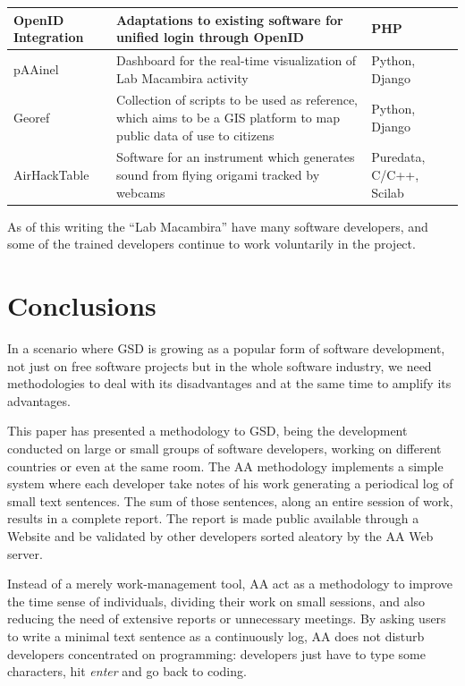 \documentclass[letterpaper]{article}
\begin{document}
\begin{table}
\begin{tabular}{|l|p{5cm}|l|}
        \hline
        OpenID Integration & Adaptations to existing software for
        unified login through OpenID & PHP \\
        \hline
        pAAinel & Dashboard for the real-time visualization of Lab
        Macambira activity & Python, Django \\
        \hline
        Georef & Collection of scripts to be used as reference, which
        aims to be a GIS platform to map public data of use to
        citizens & Python, Django \\
        \hline
        AirHackTable & Software for an instrument which generates
        sound from flying origami tracked by webcams & Puredata,
        C/C++, Scilab \\
        \hline
        \end{tabular}
    \label{tabela:criados}
\end{table}

As of this writing the ``Lab Macambira'' have many software
developers, and some of the trained developers continue to work
voluntarily in the project.

\section{Conclusions}
\label{conclusions}

In a scenario where GSD is growing as a popular form of software
development, not just on free software projects but in the whole
software industry, we need methodologies to deal with its
disadvantages and at the same time to amplify its advantages.

This paper has presented a methodology to GSD, being the development
conducted on large or small groups of software developers, working on
different countries or even at the same room. The AA methodology
implements a simple system where each developer take notes of his work
generating a periodical log of small text sentences. The sum of those
sentences, along an entire session of work, results in a complete
report. The report is made public available through a Website and be
validated by other developers sorted aleatory by the AA Web server.

Instead of a merely work-management tool, AA act as a methodology to
improve the time sense of individuals, dividing their work on small
sessions, and also reducing the need of extensive
reports or unnecessary meetings. By asking users to write a minimal
text sentence as a continuously log, AA does not disturb developers
concentrated on programming: developers just have to type some
characters, hit \textit{enter} and go back to coding.
\end{document}
